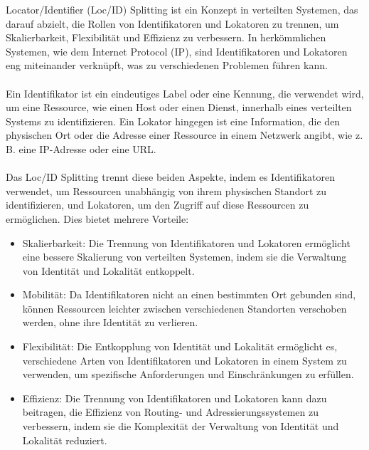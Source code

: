 \documentclass[../vs-script-first-v01.tex]{subfiles}
\begin{document}
Locator/Identifier (Loc/ID) Splitting ist ein Konzept in verteilten Systemen, das darauf abzielt, die Rollen von Identifikatoren und Lokatoren zu trennen, um Skalierbarkeit, Flexibilität und Effizienz zu verbessern. In herkömmlichen Systemen, wie dem Internet Protocol (IP), sind Identifikatoren und Lokatoren eng miteinander verknüpft, was zu verschiedenen Problemen führen kann.
\\\\
Ein Identifikator ist ein eindeutiges Label oder eine Kennung, die verwendet wird, um eine Ressource, wie einen Host oder einen Dienst, innerhalb eines verteilten Systems zu identifizieren. Ein Lokator hingegen ist eine Information, die den physischen Ort oder die Adresse einer Ressource in einem Netzwerk angibt, wie z. B. eine IP-Adresse oder eine URL.
\\\\
Das Loc/ID Splitting trennt diese beiden Aspekte, indem es Identifikatoren verwendet, um Ressourcen unabhängig von ihrem physischen Standort zu identifizieren, und Lokatoren, um den Zugriff auf diese Ressourcen zu ermöglichen. Dies bietet mehrere Vorteile:
\begin{itemize}
\item Skalierbarkeit: Die Trennung von Identifikatoren und Lokatoren ermöglicht eine bessere Skalierung von verteilten Systemen, indem sie die Verwaltung von Identität und Lokalität entkoppelt.
\item Mobilität: Da Identifikatoren nicht an einen bestimmten Ort gebunden sind, können Ressourcen leichter zwischen verschiedenen Standorten verschoben werden, ohne ihre Identität zu verlieren.
\item Flexibilität: Die Entkopplung von Identität und Lokalität ermöglicht es, verschiedene Arten von Identifikatoren und Lokatoren in einem System zu verwenden, um spezifische Anforderungen und Einschränkungen zu erfüllen.
\item Effizienz: Die Trennung von Identifikatoren und Lokatoren kann dazu beitragen, die Effizienz von Routing- und Adressierungssystemen zu verbessern, indem sie die Komplexität der Verwaltung von Identität und Lokalität reduziert.
\end{itemize}
\end{document}
